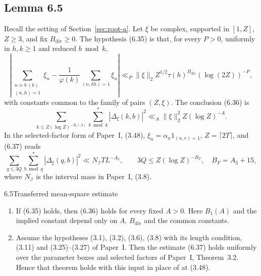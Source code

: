 \subsection{Lemma 6.5}\label{subsec:supp-lem-65}

Recall the setting of Section~\ref{sec:root-a}. Let $\xi$ be complex, supported in
$[1,Z]$, $Z\ge3$, and fix $B_{\mathrm{div}}\ge0$. The hypothesis (6.35) is
that, for every $P>0$, uniformly in $h,k\ge1$ and reduced $b\bmod k$,
\[
 \left|\sum_{\substack{n\equiv b\ (k)\\(n,h)=1}}\xi_n
 -\frac1{\varphi(k)}\sum_{(n,kh)=1}\xi_n\right|
 \ll_P\|\xi\|_2Z^{1/2}\tau(h)^{B_{\mathrm{div}}}(\log(2Z))^{-P},
 \tag{6.35}
\]
with constants common to the family of pairs $(Z,\xi)$. The conclusion
(6.36) is
\[
 \sum_{k\le Z(\log Z)^{-B_1(A)}}\sum_{b\bmod k}^{*}
       |\Delta_\xi(k,b)|^2
 \ll_A\|\xi\|_2^2 Z(\log Z)^{-A}.
 \tag{6.36}
\]
In the selected-factor form of Paper~I, (3.48), $\xi_n=\alpha_n1_{(n,r)=1}$,
$Z=\lceil2T\rceil$, and (6.37) reads
\[
 \sum_{q\le3Q}\sum_{b\bmod q}^{*}|\Delta_\xi(q,b)|^2
 \ll N_{\mathcal I}T L^{-A_3},\qquad
 3Q\le Z(\log Z)^{-B_F},\quad B_F=A_3+15,
 \tag{6.37}
\]
where $N_{\mathcal I}$ is the interval mass in Paper~I, (3.8).

\begin{mainlemma}{6.5}{Transferred mean-square estimate}
\begin{enumerate}
 \item[(i)] If \textup{(6.35)} holds, then
 \textup{(6.36)} holds for every fixed \(A>0\). Here
 \(B_1(A)\) and the implied constant depend only on \(A\),
 \(B_{\mathrm{div}}\) and the common constants.
 \item[(ii)] Assume the hypotheses (3.1), (3.2), (3.6), (3.8) with its
 length condition, (3.11) and (3.25)--(3.27) of Paper~I. Then the estimate
 \textup{(6.37)} holds uniformly over the parameter
 boxes and selected factors of Paper~I, Theorem~3.2. Hence that theorem
 holds with this input in place of \cite[Theorem~0(a)]{BFI86} at (3.48).
\end{enumerate}
\end{mainlemma}

